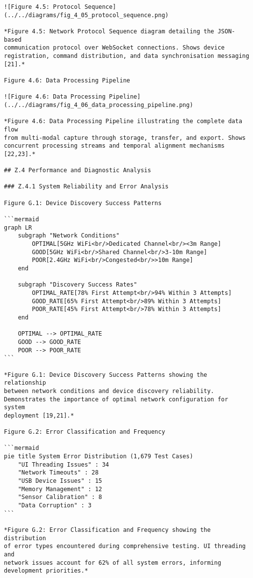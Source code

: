 \begin{verbatim}
![Figure 4.5: Protocol Sequence](../../diagrams/fig_4_05_protocol_sequence.png)

*Figure 4.5: Network Protocol Sequence diagram detailing the JSON-based
communication protocol over WebSocket connections. Shows device
registration, command distribution, and data synchronisation messaging
[21].*

Figure 4.6: Data Processing Pipeline

![Figure 4.6: Data Processing Pipeline](../../diagrams/fig_4_06_data_processing_pipeline.png)

*Figure 4.6: Data Processing Pipeline illustrating the complete data flow
from multi-modal capture through storage, transfer, and export. Shows
concurrent processing streams and temporal alignment mechanisms [22,23].*

## Z.4 Performance and Diagnostic Analysis

### Z.4.1 System Reliability and Error Analysis

Figure G.1: Device Discovery Success Patterns

```mermaid
graph LR
    subgraph "Network Conditions"
        OPTIMAL[5GHz WiFi<br/>Dedicated Channel<br/><3m Range]
        GOOD[5GHz WiFi<br/>Shared Channel<br/>3-10m Range]
        POOR[2.4GHz WiFi<br/>Congested<br/>>10m Range]
    end

    subgraph "Discovery Success Rates"
        OPTIMAL_RATE[78% First Attempt<br/>94% Within 3 Attempts]
        GOOD_RATE[65% First Attempt<br/>89% Within 3 Attempts]
        POOR_RATE[45% First Attempt<br/>78% Within 3 Attempts]
    end

    OPTIMAL --> OPTIMAL_RATE
    GOOD --> GOOD_RATE
    POOR --> POOR_RATE
```

*Figure G.1: Device Discovery Success Patterns showing the relationship
between network conditions and device discovery reliability.
Demonstrates the importance of optimal network configuration for system
deployment [19,21].*

Figure G.2: Error Classification and Frequency

```mermaid
pie title System Error Distribution (1,679 Test Cases)
    "UI Threading Issues" : 34
    "Network Timeouts" : 28
    "USB Device Issues" : 15
    "Memory Management" : 12
    "Sensor Calibration" : 8
    "Data Corruption" : 3
```

*Figure G.2: Error Classification and Frequency showing the distribution
of error types encountered during comprehensive testing. UI threading and
network issues account for 62% of all system errors, informing
development priorities.*


\end{verbatim}
